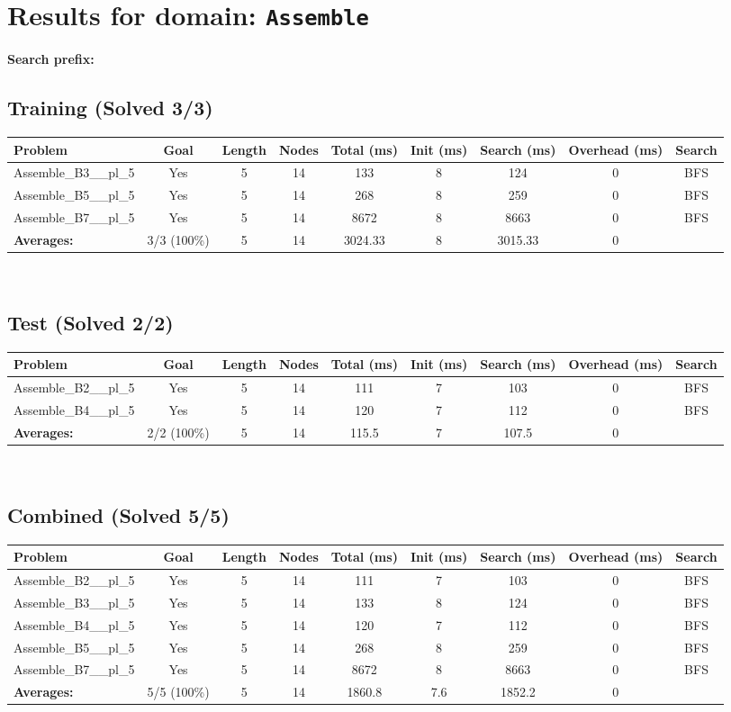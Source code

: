 \documentclass{article}
\begin{document}
\section*{Results for domain: \texttt{Assemble}}
\textbf{Search prefix:} 
\\[0.5cm]
\subsection*{Training (Solved 3/3)}
\begin{tabular}{lcccccccc}
\toprule
Problem & Goal & Length & Nodes & Total (ms) & Init (ms) & Search (ms) & Overhead (ms) & Search \\
\midrule
Assemble\_B3\_\_pl\_5 & Yes & 5 & 14 & 133 & 8 & 124 & 0 & BFS \\
Assemble\_B5\_\_pl\_5 & Yes & 5 & 14 & 268 & 8 & 259 & 0 & BFS \\
Assemble\_B7\_\_pl\_5 & Yes & 5 & 14 & 8672 & 8 & 8663 & 0 & BFS \\
\textbf{Averages:} & 3/3 (100\%) & 5 & 14 & 3024.33 & 8 & 3015.33 & 0 & \\
\bottomrule
\end{tabular}
\\[0.7cm]
\subsection*{Test (Solved 2/2)}
\begin{tabular}{lcccccccc}
\toprule
Problem & Goal & Length & Nodes & Total (ms) & Init (ms) & Search (ms) & Overhead (ms) & Search \\
\midrule
Assemble\_B2\_\_pl\_5 & Yes & 5 & 14 & 111 & 7 & 103 & 0 & BFS \\
Assemble\_B4\_\_pl\_5 & Yes & 5 & 14 & 120 & 7 & 112 & 0 & BFS \\
\textbf{Averages:} & 2/2 (100\%) & 5 & 14 & 115.5 & 7 & 107.5 & 0 & \\
\bottomrule
\end{tabular}
\\[0.7cm]
\subsection*{Combined (Solved 5/5)}
\begin{tabular}{lcccccccc}
\toprule
Problem & Goal & Length & Nodes & Total (ms) & Init (ms) & Search (ms) & Overhead (ms) & Search \\
\midrule
Assemble\_B2\_\_pl\_5 & Yes & 5 & 14 & 111 & 7 & 103 & 0 & BFS \\
Assemble\_B3\_\_pl\_5 & Yes & 5 & 14 & 133 & 8 & 124 & 0 & BFS \\
Assemble\_B4\_\_pl\_5 & Yes & 5 & 14 & 120 & 7 & 112 & 0 & BFS \\
Assemble\_B5\_\_pl\_5 & Yes & 5 & 14 & 268 & 8 & 259 & 0 & BFS \\
Assemble\_B7\_\_pl\_5 & Yes & 5 & 14 & 8672 & 8 & 8663 & 0 & BFS \\
\textbf{Averages:} & 5/5 (100\%) & 5 & 14 & 1860.8 & 7.6 & 1852.2 & 0 & \\
\bottomrule
\end{tabular}
\\[0.7cm]
\end{document}
